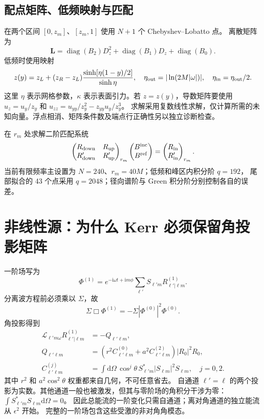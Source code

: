 \documentclass[UTF8,fontset=fandol,11pt,a4paper]{ctexart}
\newcommand{\ii}{\mathrm{i}}
\newcommand{\dd}{\mathrm{d}}
\newcommand{\Bin}{B^{\mathrm{inc}}}
\newcommand{\Bref}{B^{\mathrm{ref}}}
\numberwithin{equation}{section}
\begin{document}
\subsection{配点矩阵、低频映射与匹配}
在两个区间 $[0,z_m]$、$[z_m,1]$ 使用 $N+1$ 个 Chebyshev--Lobatto 点。
离散矩阵为
\begin{equation}
\bm L=\operatorname{diag}(B_2)D_z^2+
\operatorname{diag}(B_1)D_z+\operatorname{diag}(B_0).
\end{equation}
低频时使用映射
\begin{equation}
z(y)=z_L+(z_R-z_L)\frac{\sinh[\eta(1-y)/2]}{\sinh\eta},\quad
\eta_{\rm out}=|\ln(2M|\omega|)|,\quad\eta_{\rm in}=\eta_{\rm out}/2.
\end{equation}
这里 $\eta$ 表示网格参数，$\kappa$ 表示表面引力。若 $z=z(y)$，导数矩阵要使用
$u_z=u_y/z_y$ 和 $u_{zz}=u_{yy}/z_y^2-z_{yy}u_y/z_y^3$。
求解采用复数线性求解，仅计算所需的未知向量。浮点相消、矩阵条件数及端点行正确性另以独立诊断检查。

在 $r_m$ 处求解二阶匹配系统
\begin{equation}
\begin{pmatrix}R_{\rm down}&R_{\rm up}\\R'_{\rm down}&R'_{\rm up}\end{pmatrix}_{r_m}
\begin{pmatrix}\Bin\\\Bref\end{pmatrix}
=\begin{pmatrix}R_{\rm in}\\R'_{\rm in}\end{pmatrix}_{r_m}.
\end{equation}
当前有限频率主设置为 $N=240$、$r_m=40M$；低频和峰区内积分阶 $q=192$，
尾部拟合的 43 个点采用 $q=2048$；径向谱阶与 Green 积分阶分别控制各自的误差。

\section{非线性源：为什么 Kerr 必须保留角投影矩阵}
一阶场写为
\begin{equation}
\Phi^{(1)}=e^{-\ii\omega t+\ii m\phi}\sum_{\ell'}S_{\ell'm}R^{(1)}_{\ell'|\ell m}.
\end{equation}
分离波方程前必须乘以 $\Sigma$，故
\begin{equation}
\Sigma\Box\Phi^{(1)}=-\Sigma|\Phi^{(0)}|^2\Phi^{(0)}.
\end{equation}
角投影得到
\begin{align}
\mathcal L_{\ell'm\omega}R^{(1)}_{\ell'|\ell m}&=-Q_{\ell'\ell m},\\
Q_{\ell'\ell m}&=(r^2 C^{(0)}_{\ell'\ell m}+a^2 C^{(2)}_{\ell'\ell m})|R_0|^2R_0,\\
C^{(j)}_{\ell'\ell m}&=\int\dd\Omega\,\cos^j\theta\,S_{\ell'm}^*|S_{\ell m}|^2S_{\ell m},\quad j=0,2.
\end{align}
其中 $r^2$ 和 $a^2\cos^2\theta$ 权重都来自几何，不可任意省去。
自通道 $\ell'=\ell$ 的两个投影为实数。其他通道一般也被激发，但其与零阶场的角积分干涉为零：
$\int S_{\ell'm}^*S_{\ell m}\dd\Omega=0$。
因此总能流的一阶变化只需自通道；离对角通道的独立能流从 $\epsilon^2$ 开始。
完整的一阶场包含这些受激的非对角角模态。
\end{document}
